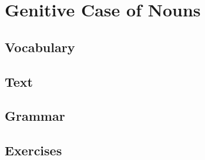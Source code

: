 \chapter{Genitive Case of Nouns}
\section*{Vocabulary}
\section*{Text}
\section*{Grammar}
\section*{Exercises}
